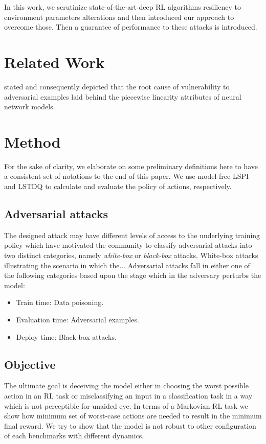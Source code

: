 \documentclass{article}
\begin{document}
    In this work, we scrutinize state-of-the-art deep RL algorithms resiliency to environment parameters alterations
    and then introduced our approach to overcome those. Then a guarantee of performance to these attacks is introduced.


    \section{Related Work}
    \cite{Goodfellow2014} stated and consequently depicted that the root cause of vulnerability to adversarial
    examples laid behind the piecewise linearity attributes of neural network models.


    \section{Method}
    For the sake of clarity, we elaborate on some preliminary definitions here to have a consistent set of notations
    to the end of this paper. We use model-free LSPI and LSTDQ \citep{Lagoudakis2003} to calculate and
    evaluate the policy of actions, respectively.


    \subsection{Adversarial attacks}
    The designed attack may have different levels of access to the underlying training policy which have motivated
    the community to classify adversarial attacks into two distinct categories, namely \textit{white-box} or
    \textit{black-box} attacks. White-box attacks illustrating the scenario in which the... Adversarial attacks fall
    in either one of the following categories based upon the stage which in the adversary perturbs the model:
    \begin{itemize}
        \item Train time: Data poisoning.
        \item Evaluation time: Adversarial examples.
        \item Deploy time: Black-box attacks.
    \end{itemize}


    \subsection{Objective}
    The ultimate goal is deceiving the model either in choosing the worst possible action in an RL task or misclassifying an input in a classification task in a way which is not perceptible for unaided eye. In terms of a Markovian RL task we show how minimum set of worst-case actions are needed to result in the minimum final reward. We try to show that the model is not robust to other configuration of each benchmarks with different dynamics.
\end{document}
